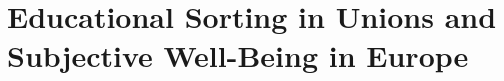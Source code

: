 \chapter{Educational Sorting in Unions and Subjective Well-Being in Europe}
\label{chap:edu-sorting-swb}








